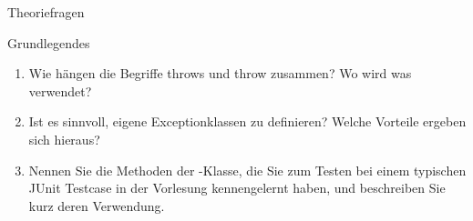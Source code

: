 \documentclass{../preamble}
\date{18.01.2021 - 22.01.2021}
\begin{document}
\maketitle

\makedisclaimer

\clearpage

\begin{task}[credit = \stars{0}{3}]{Theoriefragen}
    \begin{subtask*}{Grundlegendes}
        \begin{enumerate}
            \item Wie hängen die Begriffe \textcolor{keywordcolor}{throws} und \textcolor{keywordcolor}{throw} zusammen? Wo wird was verwendet?
            \item Ist es sinnvoll, eigene Exceptionklassen zu definieren? Welche Vorteile ergeben sich hieraus?
            \item Nennen Sie die Methoden der -Klasse, die Sie zum Testen bei einem typischen JUnit Testcase in der Vorlesung  kennengelernt haben, und beschreiben Sie kurz deren Verwendung.
        \end{enumerate}

        \begin{solution}
            \begin{enumerate}


\end{enumerate}
\end{solution}
\end{subtask*}
\end{task}
\end{document}
